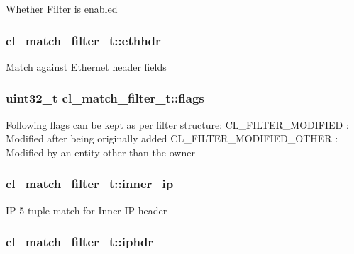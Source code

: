 Whether Filter is enabled \hypertarget{structcl__match__filter__t_a5ae577cb62beb21526852c690c114daf}{
\subsubsection[{ethhdr}]{ cl\-\_\-match\-\_\-filter\-\_\-t\-::ethhdr}}\label{structcl__match__filter__t_a5ae577cb62beb21526852c690c114daf}
Match against Ethernet header fields \hypertarget{structcl__match__filter__t_ab37ad5c104db0aa7323f66093a822f5c}{
\subsubsection[{flags}]{\setlength{\rightskip}{0pt plus 5cm}uint32\-\_\-t cl\-\_\-match\-\_\-filter\-\_\-t\-::flags}}\label{structcl__match__filter__t_ab37ad5c104db0aa7323f66093a822f5c}
Following flags can be kept as per filter structure\-: C\-L\-\_\-\-F\-I\-L\-T\-E\-R\-\_\-\-M\-O\-D\-I\-F\-I\-E\-D \-: Modified after being originally added C\-L\-\_\-\-F\-I\-L\-T\-E\-R\-\_\-\-M\-O\-D\-I\-F\-I\-E\-D\-\_\-\-O\-T\-H\-E\-R \-: Modified by an entity other than the owner \hypertarget{structcl__match__filter__t_a4c6b0da49677eba7fea7787b01ad0623}{
\subsubsection[{inner\-\_\-ip}]{ cl\-\_\-match\-\_\-filter\-\_\-t\-::inner\-\_\-ip}}\label{structcl__match__filter__t_a4c6b0da49677eba7fea7787b01ad0623}
I\-P 5-\/tuple match for Inner I\-P header \hypertarget{structcl__match__filter__t_afcf3c38c71289d28a01fe1092010a2a2}{
\subsubsection[{iphdr}]{ cl\-\_\-match\-\_\-filter\-\_\-t\-::iphdr}}\label{structcl__match__filter__t_afcf3c38c71289d28a01fe1092010a2a2}
